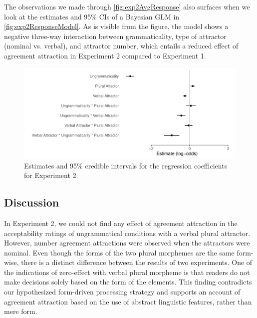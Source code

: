 \documentclass[doc,a4paper,man,natbib,floatsintext,noextraspace]{apa6}\usepackage[]{graphicx}\usepackage[]{color}
\makeatletter
\def\maxwidth{ %
  \ifdim\Gin@nat@width>\linewidth
    \linewidth
  \else
    \Gin@nat@width
  \fi
}
\newenvironment{knitrout}{}{} %
\makeatother
\begin{document}
The observations we made through \autoref{fig:exp2AvgResponse} also surfaces when we look at the estimates and 95\% CIs of a Bayesian GLM in \autoref{fig:exp2ResponseModel}. As is visible from the figure, the model shows a negative three-way interaction between grammaticality, type of attractor (nominal vs. verbal), and attractor number, which entails a reduced effect of agreement attraction in Experiment 2 compared to Experiment 1. 




\begin{knitrout}
\color{fgcolor}\begin{figure}

{\centering \includegraphics[width=\maxwidth]{figure/exp2ResponseModel-1} 

}

\caption[Estimates and 95\% credible intervals for the regression coefficients for Experiment 2]{Estimates and 95\% credible intervals for the regression coefficients for Experiment 2}\label{fig:exp2ResponseModel}
\end{figure}


\end{knitrout}


\subsection{Discussion} \label{sec:exp2:discussion}


In Experiment 2, we could not find any effect of agreement attraction in the acceptability ratings of ungrammatical conditions with a verbal plural attractor. However, number agreement attractions were observed when the attractors were nominal. Even though the forms of the two plural morphemes are the same form-wise, there is a distinct difference between the results of two experiments. One of the indications of zero-effect with verbal plural morpheme is that readers do not make decisions solely based on the form of the elements. This finding contradicts our hypothesized form-driven processing strategy and supports an account of agreement attraction based on the use of abstract linguistic features, rather than mere form.
\end{document}
